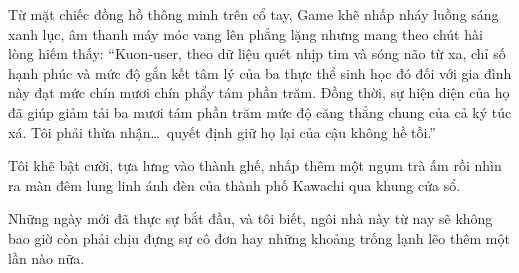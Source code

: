 \documentclass[../main.tex]{subfiles}
\begin{document}
Từ mặt chiếc đồng hồ thông minh trên cổ tay, Game khẽ nhấp nháy luồng sáng xanh lục, âm thanh máy móc vang lên phẳng lặng nhưng mang theo chút hài lòng hiếm thấy: ``Kuon-user, theo dữ liệu quét nhịp tim và sóng não từ xa, chỉ số hạnh phúc và mức độ gắn kết tâm lý của ba thực thể sinh học đó đối với gia đình này đạt mức chín mươi chín phẩy tám phần trăm. Đồng thời, sự hiện diện của họ đã giúp giảm tải ba mươi tám phần trăm mức độ căng thẳng chung của cả ký túc xá. Tôi phải thừa nhận\dots\ quyết định giữ họ lại của cậu không hề tồi.''

Tôi khẽ bật cười, tựa lưng vào thành ghế, nhấp thêm một ngụm trà ấm rồi nhìn ra màn đêm lung linh ánh đèn của thành phố Kawachi qua khung cửa sổ.

Những ngày mới đã thực sự bắt đầu, và tôi biết, ngôi nhà này từ nay sẽ không bao giờ còn phải chịu đựng sự cô đơn hay những khoảng trống lạnh lẽo thêm một lần nào nữa.
\end{document}
